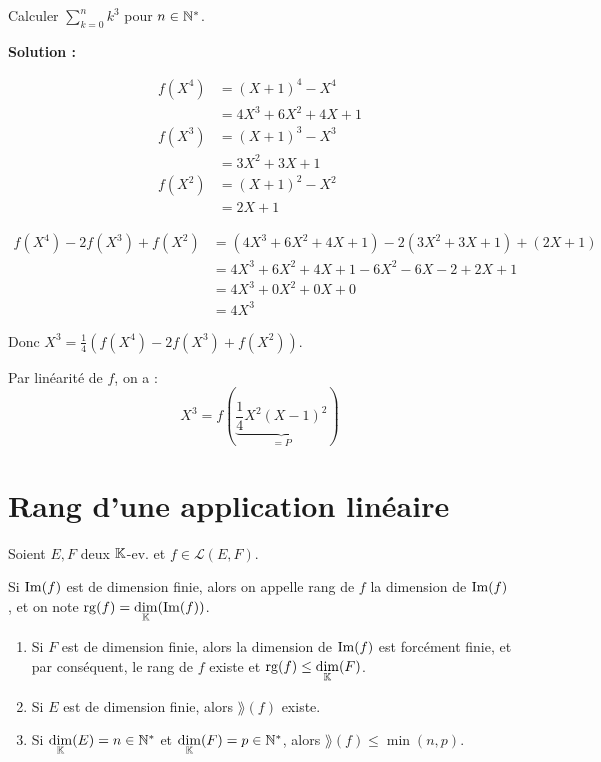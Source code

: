 \documentclass[12pt, a4paper]{report}
\begin{document}
\begin{application}
    Calculer $\sum_{k=0}^{n}k^3$ pour $n \in \mathbb{N}^*$.

    \textbf{Solution :}

    \begin{align*}
        f(X^4) &= (X+1)^4 - X^4\\
        &= 4X^3 + 6X^2 + 4X + 1\\
        f(X^3) &= (X+1)^3 - X^3\\
        &= 3X^2 + 3X + 1\\
        f(X^2) &= (X+1)^2 - X^2\\
        &= 2X + 1
    \end{align*}

    \begin{align*}
        f(X^4) - 2f(X^3) + f(X^2) &= (4X^3 + 6X^2 + 4X + 1) - 2(3X^2 + 3X + 1) + (2X + 1)\\
        &= 4X^3 + 6X^2 + 4X + 1 - 6X^2 - 6X - 2 + 2X + 1\\
        &= 4X^3 + 0X^2 + 0X + 0\\
        &= 4X^3
    \end{align*}

    Donc $X^3 = \frac{1}{4}(f(X^4) - 2f(X^3) + f(X^2))$.

    Par linéarité de $f$, on a :
    $$X^3 = f(\underbrace{\frac14 X^2(X-1)^2}_{=P})$$
\end{application}

\section{Rang d'une application linéaire}

\begin{definition}
    Soient $E,F$ deux $\mathbb{K}$-ev. et $f \in \mathcal L(E,F)$.

    Si $\mathrm{Im}(f)$ est de dimension finie, alors on appelle rang de $f$ la dimension de $\mathrm{Im}(f)$, et on note $\mathrm{rg}(f) = \underset{\mathbb{K}}\dim(\mathrm{Im}(f))$.
\end{definition}

\begin{remark}
    \begin{enumerate}
        \item Si $F$ est de dimension finie, alors la dimension de $\mathrm{Im}(f)$ est forcément finie, et par conséquent, le rang de $f$ existe et $\mathrm{rg}(f) \le \underset{\mathbb{K}}\dim(F)$. 
        \item Si $E$ est de dimension finie, alors $\rang(f)$ existe.
        \item Si $\underset{\mathbb{K}}\dim(E) = n \in \mathbb{N}^*$ et $\underset{\mathbb{K}}\dim(F) = p \in \mathbb{N}^*$, alors $\rang(f) \le \min(n,p)$.
    \end{enumerate}
\end{remark}
\end{document}
